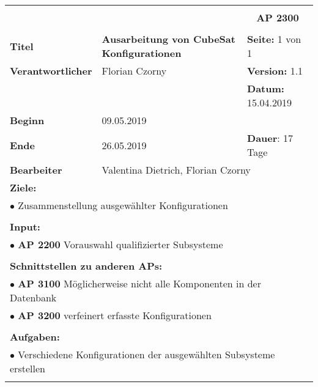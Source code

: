 \clearpage
\begin{table}[!h]
 \begin{center}
  \begin{tabular}{|p{35mm}||p{55mm}|p{50mm}||p{40mm}|}
   \hline
   \multicolumn{3}{|l||}{\textbf{}} & \multicolumn{1}{c|}{}\\
   \multicolumn{3}{|l||}{\textbf{}} & \multicolumn{1}{c|}{\textbf{AP 2300}}\\
   \multicolumn{3}{|l||}{\textbf{}} & \multicolumn{1}{c|}{}\\
   \hline\hline
   \textbf{Titel} & \multicolumn{2}{p{7cm}||}{\textbf{Ausarbeitung von CubeSat Konfigurationen}} & \textbf{Seite:} 1 von 1\\
   \hline
   \textbf{Verantwortlicher} & \multicolumn{2}{l||}{Florian Czorny} & \textbf{Version:} 1.1\\
   \hline
   \multicolumn{3}{|l||}{} & \textbf{Datum:} 15.04.2019\\
   \hline\hline
   \textbf{Beginn} & \multicolumn{2}{l||}{09.05.2019} & \\
   \hline
   \textbf{Ende} & \multicolumn{2}{l||}{26.05.2019} & \textbf{Dauer}: 17 Tage\\
   \hline\hline
   \textbf{Bearbeiter} & \multicolumn{3}{l|}{Valentina Dietrich, Florian Czorny}\\
   \hline\hline
   \multicolumn{4}{|p{150mm}|}{\textbf{Ziele:}}\\
   \multicolumn{4}{|p{150mm}|}{$\bullet$ Zusammenstellung ausgewählter Konfigurationen}\\
   \multicolumn{4}{|p{150mm}|}{}\\
   \multicolumn{4}{|p{150mm}|}{\textbf{Input:}}\\
   \multicolumn{4}{|p{150mm}|}{$\bullet$ \textbf{AP 2200} Vorauswahl qualifizierter Subsysteme}\\
   \multicolumn{4}{|p{150mm}|}{}\\
   \multicolumn{4}{|p{150mm}|}{\textbf{Schnittstellen zu anderen APs:}}\\
   \multicolumn{4}{|p{150mm}|}{$\bullet$ \textbf{AP 3100} Möglicherweise nicht alle Komponenten in der Datenbank}\\
   \multicolumn{4}{|p{150mm}|}{$\bullet$ \textbf{AP 3200} verfeinert erfasste Konfigurationen}\\
   \multicolumn{4}{|p{150mm}|}{}\\
   \multicolumn{4}{|p{150mm}|}{\textbf{Aufgaben:}}\\
   \multicolumn{4}{|p{150mm}|}{$\bullet$ Verschiedene Konfigurationen der ausgewählten Subsysteme erstellen}\\
   \multicolumn{4}{|p{150mm}|}{}\\
   \hline
  \end{tabular}
 \end{center}
\end{table}

